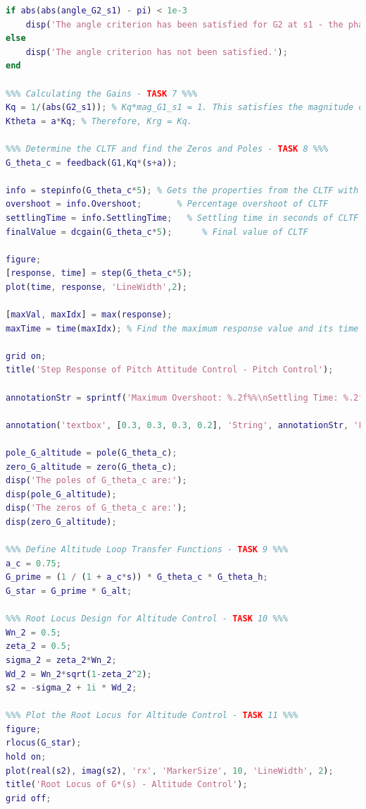 \documentclass[stu, a4paper, 12pt, floatsintext]{apa7}
\numberwithin{figure}{section}
\numberwithin{table}{section}
\numberwithin{equation}{section}
\begin{document}
\begin{lstlisting}[language=MATLAB]
%%% Check to see if the angle criterion is satisfied %%%
if abs(abs(angle_G2_s1) - pi) < 1e-3
    disp('The angle criterion has been satisfied for G2 at s1 - the phase is approximately pi.');
else
    disp('The angle criterion has not been satisfied.');
end

%%% Calculating the Gains - TASK 7 %%%
Kq = 1/(abs(G2_s1)); % Kq*mag_G1_s1 = 1. This satisfies the magnitude condition at s1. This means the CL pole will be at s1. 
Ktheta = a*Kq; % Therefore, Krg = Kq.

%%% Determine the CLTF and find the Zeros and Poles - TASK 8 %%%
G_theta_c = feedback(G1,Kq*(s+a));

info = stepinfo(G_theta_c*5); % Gets the properties from the CLTF with a step change of 5 degrees.
overshoot = info.Overshoot;       % Percentage overshoot of CLTF
settlingTime = info.SettlingTime;   % Settling time in seconds of CLTF
finalValue = dcgain(G_theta_c*5);      % Final value of CLTF

figure;
[response, time] = step(G_theta_c*5);
plot(time, response, 'LineWidth',2);

[maxVal, maxIdx] = max(response); 
maxTime = time(maxIdx); % Find the maximum response value and its time

grid on;
title('Step Response of Pitch Attitude Control - Pitch Control');

annotationStr = sprintf('Maximum Overshoot: %.2f%%\nSettling Time: %.2f s\nFinal Value: %.2f', overshoot, settlingTime, finalValue); % Creates the annotation text with variable placeholders.

annotation('textbox', [0.3, 0.3, 0.3, 0.2], 'String', annotationStr, 'FitBoxToText', 'on', 'BackgroundColor', '#ADD8E6', 'EdgeColor', 'black', 'FontSize', 50); % Creates the annotation with a text box.

pole_G_altitude = pole(G_theta_c);
zero_G_altitude = zero(G_theta_c);
disp('The poles of G_theta_c are:');
disp(pole_G_altitude);
disp('The zeros of G_theta_c are:');
disp(zero_G_altitude);

%%% Define Altitude Loop Transfer Functions - TASK 9 %%%
a_c = 0.75;
G_prime = (1 / (1 + a_c*s)) * G_theta_c * G_theta_h; 
G_star = G_prime * G_alt;

%%% Root Locus Design for Altitude Control - TASK 10 %%%
Wn_2 = 0.5;
zeta_2 = 0.5;
sigma_2 = zeta_2*Wn_2;
Wd_2 = Wn_2*sqrt(1-zeta_2^2);
s2 = -sigma_2 + 1i * Wd_2;

%%% Plot the Root Locus for Altitude Control - TASK 11 %%%
figure;
rlocus(G_star);
hold on;
plot(real(s2), imag(s2), 'rx', 'MarkerSize', 10, 'LineWidth', 2);
title('Root Locus of G*(s) - Altitude Control');
grid off;


\end{lstlisting}
\end{document}
